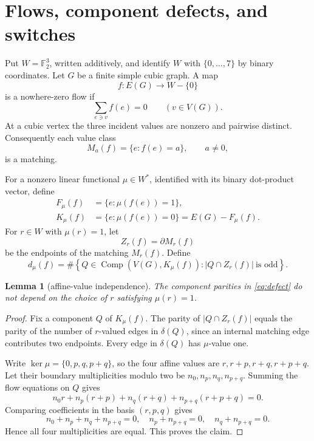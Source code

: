 \documentclass[11pt]{article}
\newtheorem{lemma}[theorem]{Lemma}
\theoremstyle{definition}
\theoremstyle{remark}
\newcommand{\F}{\mathbb F}
\newcommand{\bd}{\partial}
\newcommand{\Comp}{\operatorname{Comp}}
\numberwithin{equation}{section}
\begin{document}
\section{Flows, component defects, and switches}

Put \(W=\F_2^3\), written additively, and identify \(W\) with
\(\{0,\ldots,7\}\) by binary coordinates.  Let \(G\) be a finite simple
cubic graph.  A map
\[
                 f:E(G)\longrightarrow W-\{0\}
\]
is a nowhere-zero flow if
\[
                 \sum_{e\ni v}f(e)=0
                 \qquad(v\in V(G)).
\]
At a cubic vertex the three incident values are nonzero and pairwise
distinct.  Consequently each value class
\[
                 M_a(f)=\{e:f(e)=a\},\qquad a\ne0,
\]
is a matching.

For a nonzero linear functional \(\mu\in W^*\), identified with its
binary dot-product vector, define
\begin{equation}
\begin{split}
 F_\mu(f)&=\{e:\mu(f(e))=1\},\\
 K_\mu(f)&=\{e:\mu(f(e))=0\}=E(G)-F_\mu(f).
\end{split}
\end{equation}
For \(r\in W\) with \(\mu(r)=1\), let
\[
 Z_r(f)=\bd M_r(f)
\]
be the endpoints of the matching \(M_r(f)\).  Define
\begin{equation}
 d_\mu(f)=
 \#\left\{Q\in\Comp(V(G),K_\mu(f)):
                    |Q\cap Z_r(f)|\ \text{is odd}\right\}.
\label{eq:defect}
\end{equation}

\begin{lemma}[affine-value independence]\label{lem:affine}
The component parities in \eqref{eq:defect} do not depend on the choice of
\(r\) satisfying \(\mu(r)=1\).
\end{lemma}

\begin{proof}
Fix a component \(Q\) of \(K_\mu(f)\).  The parity of
\(|Q\cap Z_r(f)|\) equals the parity of the number of \(r\)-valued edges
in \(\delta(Q)\), since an internal matching edge contributes two
endpoints.  Every edge in \(\delta(Q)\) has \(\mu\)-value one.

Write \(\ker\mu=\{0,p,q,p+q\}\), so the four affine values are
\(r,r+p,r+q,r+p+q\).  Let their boundary multiplicities modulo two be
\(n_0,n_p,n_q,n_{p+q}\).  Summing the flow equations on \(Q\) gives
\[
 n_0r+n_p(r+p)+n_q(r+q)+n_{p+q}(r+p+q)=0.
\]
Comparing coefficients in the basis \((r,p,q)\) gives
\[
 n_0+n_p+n_q+n_{p+q}=0,\quad
 n_p+n_{p+q}=0,\quad n_q+n_{p+q}=0.
\]
Hence all four multiplicities are equal.  This proves the claim.
\end{proof}
\end{document}
